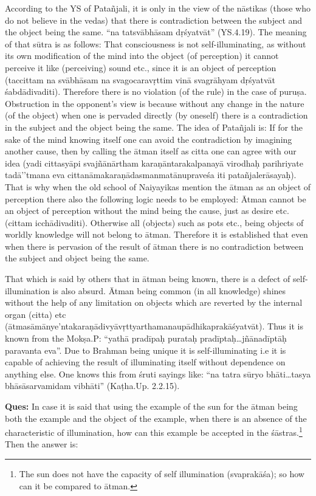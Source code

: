 According to the YS of Patañjali, it is only in the view of the nāstikas (those who do not believe in the vedas) that there is contradiction between the subject and the object being the same.  “na tatsvābhāsam dṛśyatvāt” (YS.4.19). The meaning of that sūtra is as follows: That consciousness is not self-illuminating, as without its own modification of the mind into the object (of perception) it cannot perceive it like (perceiving) sound etc., since it is an object of perception (taccittam na svābhāsam na svagocaravṛttim vinā svagrāhyam dṛśyatvāt śabdādivaditi). Therefore there is no violation (of the rule) in the case of puruṣa.   Obstruction in the opponent’s view is because without any change in the nature (of the object) when one is pervaded directly (by oneself) there is a contradiction in the subject and the object being the same. The idea of Patañjali is:  If for the sake of the mind knowing itself one can avoid the contradiction by imagining another cause, then by calling the ātman itself as citta one can agree with our idea (yadi cittasyāpi svajñānārtham karaṇāntarakalpanayā virodhaḥ parihriyate tadā’’tmana eva cittanāmakaraṇādasmanmatānupraveśa iti patañjalerāsayaḥ). That is why when the old school of Naiyayikas mention the ātman as an object of perception there also the following logic needs to be employed: Ātman cannot be an object of perception without the mind being the cause, just as desire etc. (cittam icchādivaditi).  Otherwise all (objects) such as pots etc., being objects of worldly knowledge will not belong to ātman. Therefore it is established that even when there is pervasion of the result of ātman there is no contradiction between the subject and object being the same.

That which is said by others that in ātman being known, there is a defect of self-illumination is also absurd. Ātman being common (in all knowledge) shines without the help of any limitation on objects which are reverted by the internal organ (citta) etc (ātmasāmānye’ntakaraṇā\-divyāvṛttyarthamanaupādhikaprakāśyatvāt). Thus it is known from the Mokṣa.P: “yathā pradīpaḥ purataḥ pradīptaḥ…jñānadīptāḥ paravanta eva”. Due to Brahman being unique it is self-illuminating i.e it is capable of achieving the result of illuminating itself without dependence on anything else. One knows this from śruti sayings like: “na tatra sūryo bhāti…tasya bhāsāsarvamidam vibhāti” (Kaṭha.Up. 2.2.15). 

\vskip -1pt

\textbf{Ques:} In case it is said that using the example of the sun for the ātman being both the   example and the object of the  example, when there is an absence of the characteristic of illumination, how can this example be accepted in the śāstras.\footnote{The sun does not have the capacity of self illumination (svaprakāśa); so how can it be compared to ātman.} Then the answer is: 

